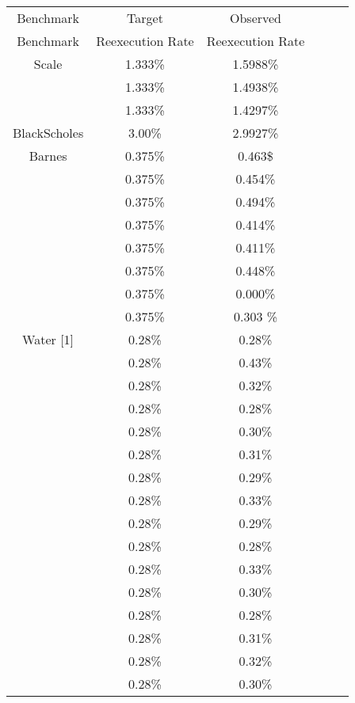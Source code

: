 \documentclass[11pt]{article}
\begin{document}
\begin{table}[thbp]
\centering
\begin{tabular}{c|ccccc|}
	Benchmark & Target & Observed \\
	Benchmark & Reexecution Rate & Reexecution Rate \\
	\hline
	
	Scale & 1.333\% & 1.5988\%  \\
              & 1.333\% & 1.4938\% \\
              & 1.333\% & 1.4297\%  \\
            
	BlackScholes & 3.00\% & 2.9927\% \\
        Barnes & 0.375\% & 0.463\$  \\
               & 0.375\% & 0.454\% \\
               & 0.375\% & 0.494\% \\
               & 0.375\% & 0.414\%\\
               & 0.375\% & 0.411\%\\
               & 0.375\% & 0.448\% \\
               & 0.375\% & 0.000\% \\
               & 0.375\% & 0.303 \% \\
        Water [1] & 0.28\% & 0.28\% \\
                  & 0.28\% & 0.43\% \\ 
                  & 0.28\% & 0.32\% \\ 
                  & 0.28\% & 0.28\% \\ 
                  & 0.28\% & 0.30\% \\ 
                  & 0.28\% & 0.31\% \\ 
                  & 0.28\% & 0.29\% \\ 
                  & 0.28\% & 0.33\% \\ 
                  & 0.28\% & 0.29\% \\ 
                  & 0.28\% & 0.28\% \\ 
                  & 0.28\% & 0.33\% \\ 
                  & 0.28\% & 0.30\% \\ 
                  & 0.28\% & 0.28\% \\ 
                  & 0.28\% & 0.31\% \\ 
                  & 0.28\% & 0.32\% \\ 
                  & 0.28\% & 0.30\% \\ 

\end{tabular}
\end{table}
\end{document}
